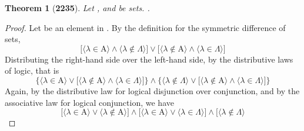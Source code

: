 \documentclass[preview]{standalone}
\newtheorem*{theorem*}{Theorem}
\begin{document}
\begin{theorem*}[\textbf{2235}] \color{black}
    Let , and \bm{$\Lambda$} be sets. 
    .
\end{theorem*}
\begin{proof} \color{black}
    Let \bm{$\lambda$} be an element in . 
    By the definition for the symmetric difference of sets,
    \begin{equation*}
        \bigg[
            \Big \langle \lambda \in \mathrm{A} \Big \rangle 
                \land 
            \Big \langle \lambda \notin \Lambda \Big \rangle
        \bigg] 
            \lor 
        \bigg[
            \Big \langle \lambda \notin \mathrm{A} \Big \rangle
                \land 
            \Big \langle \lambda \in \Lambda \Big \rangle
        \bigg]
    \end{equation*}
    Distributing the right-hand side over the left-hand side,
    by the distributive laws of logic, that is
    \begin{equation*}
        \Bigg\{
            \Big \langle \lambda \in \mathrm{A} \Big \rangle
                \lor
            \bigg[
                \Big \langle \lambda \notin \mathrm{A} \Big \rangle
                    \land 
                \Big \langle \lambda \in \Lambda \Big \rangle
            \bigg]
        \Bigg\}
            \land
        \Bigg\{
            \Big \langle \lambda \notin \Lambda \Big \rangle
                \lor
            \bigg[
                \Big \langle \lambda \notin \mathrm{A} \Big \rangle
                    \land 
                \Big \langle \lambda \in \Lambda \Big \rangle
            \bigg]
        \Bigg\}
    \end{equation*}
    Again, by the distributive law for logical disjunction over conjunction,
    and by the associative law for logical conjunction, we have
    \begin{equation*}
        \bigg[
            \Big \langle \lambda \in \mathrm{A} \Big \rangle
                \lor
            \Big \langle \lambda \notin \mathrm{A} \Big \rangle
        \bigg]
            \land
        \bigg[
            \Big \langle \lambda \in \mathrm{A} \Big \rangle
                \lor 
            \Big \langle \lambda \in \Lambda \Big \rangle
        \bigg]
            \land
        \bigg[
            \Big \langle \lambda \notin \Lambda \Big \rangle

\end{equation*}
\end{proof}
\end{document}
